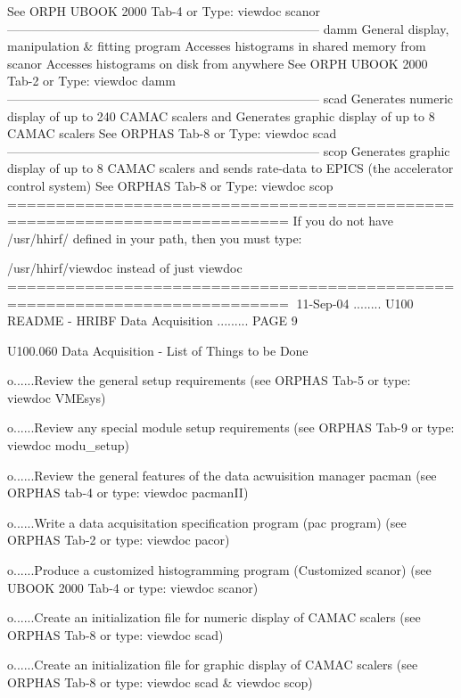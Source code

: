                   See ORPH UBOOK 2000 Tab-4 or Type: viewdoc scanor
   ---------------------------------------------------------------------------
   damm           General display, manipulation & fitting program
                  Accesses histograms in shared memory from scanor
                  Accesses histograms on disk from anywhere
                  See ORPH UBOOK 2000 Tab-2 or Type: viewdoc damm
   ---------------------------------------------------------------------------
   scad           Generates numeric display of up to 240 CAMAC scalers and
                  Generates graphic display of up to 8 CAMAC scalers
                  See ORPHAS Tab-8 or Type: viewdoc scad
   ---------------------------------------------------------------------------
   scop           Generates graphic display of up to 8 CAMAC scalers and
                  sends rate-data to EPICS (the accelerator control system)
                  See ORPHAS Tab-8 or Type: viewdoc scop
   ===========================================================================
   If you do not have /usr/hhirf/ defined in your path, then you must type:
 
   /usr/hhirf/viewdoc instead of just viewdoc
   ===========================================================================
    
   11-Sep-04 ........ U100  README - HRIBF Data Acquisition ......... PAGE   9
 
 
 
   U100.060  Data Acquisition - List of Things to be Done
 
 
   o......Review the general setup requirements
          (see ORPHAS Tab-5 or type: viewdoc VMEsys)
 
 
   o......Review any special module setup requirements
          (see ORPHAS Tab-9 or type: viewdoc modu_setup)
 
   o......Review the general features of the data acwuisition manager pacman
          (see ORPHAS tab-4 or type: viewdoc pacmanII)
 
 
   o......Write a data acquisitation specification program (pac program)
          (see ORPHAS Tab-2 or type: viewdoc pacor)
 
 
   o......Produce a customized histogramming program (Customized scanor)
          (see UBOOK 2000 Tab-4 or type: viewdoc scanor)
 
 
   o......Create an initialization file for numeric display of CAMAC scalers
          (see ORPHAS Tab-8 or type: viewdoc scad)
 
 
   o......Create an initialization file for graphic display of CAMAC scalers
          (see ORPHAS Tab-8 or type: viewdoc scad & viewdoc scop)
 
